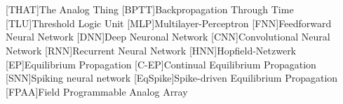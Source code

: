\section*{}

\begin{acronym}[WYSIWYG]\itemsep0pt
  [THAT]{The Analog Thing}
  [BPTT]{Backpropagation Through Time}
  [TLU]{Threshold Logic Unit}
  [MLP]{Multilayer-Perceptron}
  [FNN]{Feedforward Neural Network}
  [DNN]{Deep Neuronal Network}
  [CNN]{Convolutional Neural Network}
  [RNN]{Recurrent Neural Network}
  [HNN]{Hopfield-Netzwerk}
  [EP]{Equilibrium Propagation}
  [C-EP]{Continual Equilibrium Propagation}
  [SNN]{Spiking neural network}
  [EqSpike]{Spike-driven Equilibrium Propagation}
  [FPAA]{Field Programmable Analog Array}
\end{acronym}
